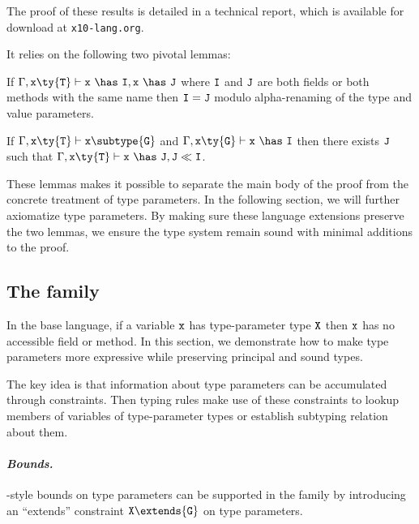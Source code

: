 The proof of these results is detailed in a technical report, which is available for download at {\tt x10-lang.org}.

It relies on the following two pivotal lemmas:

\begin{lemma}
If $\Gamma,{\tt x}\ty{\tt T}\vdash{\tt x}~\has~{\tt I},{\tt x}~\has~{\tt J}$ where $\tt I$ and $\tt J$ are both fields or both methods with the same name then ${\tt I}={\tt J}$ modulo alpha-renaming of the type and value parameters.
\end{lemma}

\begin{lemma}
If $\Gamma,{\tt x}\ty{\tt T}\vdash{\tt x}\subtype{\tt G}$ and $\Gamma,{\tt x}\ty{\tt G}\vdash{\tt x}~\has~{\tt I}$ then there exists $\tt J$ such that $\Gamma,{\tt x}\ty{\tt T}\vdash{\tt x}~\has~{\tt J}, {\tt J} \ll {\tt I}$.
\end{lemma}

These lemmas makes it possible to separate the main body of the proof from the concrete treatment of type parameters. In the following section, we will further axiomatize type parameters. By making sure these language extensions preserve the two lemmas, we ensure the type system remain sound with minimal additions to the proof.

\subsection{The \FXG family}

In the base \FXG language, if a variable $\tt x$ has type-parameter type $\tt X$ then $\tt x$ has no accessible field or method. In this section, we demonstrate how to make type parameters more expressive while preserving principal and sound types.

The key idea is that information about type parameters can be accumulated through constraints. Then typing rules make use of these constraints to lookup members of variables of type-parameter types or establish subtyping relation about them.

\paragraph{\normalfont\bf\em Bounds.} \FGJ-style bounds on type parameters can be supported in the \FXG family by introducing an ``extends'' constraint \mbox{${\tt X}\extends{\tt G}$} on type parameters.

